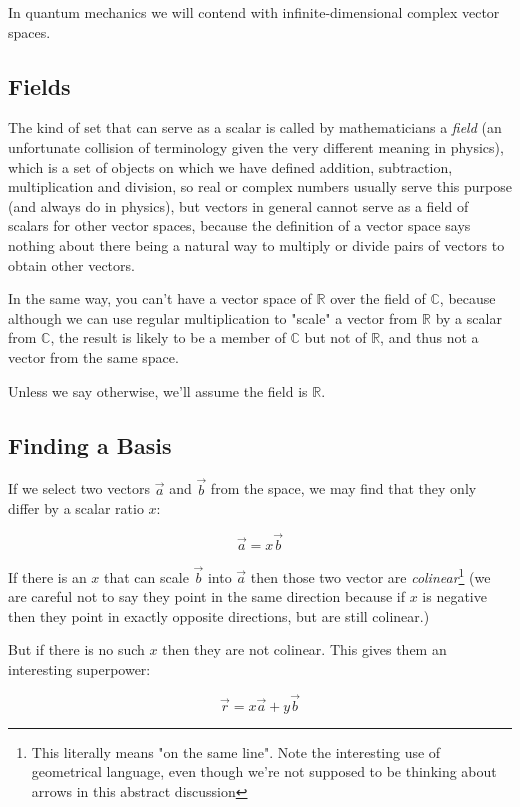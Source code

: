 In quantum mechanics we will contend with infinite-dimensional complex vector spaces.

\subsection{Fields}

The kind of set that can serve as a scalar is called by mathematicians a \textit{field} (an unfortunate collision of terminology given the very different meaning in physics), which is a set of objects on which we have defined addition, subtraction, multiplication and division, so real or complex numbers usually serve this purpose (and always do in physics), but vectors in general cannot serve as a field of scalars for other vector spaces, because the definition of a vector space says nothing about there being a natural way to multiply or divide pairs of vectors to obtain other vectors.

In the same way, you can't have a vector space of $\mathbb{R}$ over the field of $\mathbb{C}$, because although we can use regular multiplication to "scale" a vector from $\mathbb{R}$ by a scalar from $\mathbb{C}$, the result is likely to be a member of $\mathbb{C}$ but not of $\mathbb{R}$, and thus not a vector from the same space.

Unless we say otherwise, we'll assume the field is $\mathbb{R}$.

\subsection{Finding a Basis}

If we select two vectors $\vec{a}$ and $\vec{b}$ from the space, we may find that they only differ by a scalar ratio $x$:

$$
\vec{a} = x \vec{b}
$$

If there is an $x$ that can scale $\vec{b}$ into $\vec{a}$ then those two vector are \textit{colinear}\footnote{This literally means "on the same line". Note the interesting use of geometrical language, even though we're not supposed to be thinking about arrows in this abstract discussion} (we are careful not to say they point in the same direction because if $x$ is negative then they point in exactly opposite directions, but are still colinear.)

But if there is no such $x$ then they are not colinear. This gives them an interesting superpower:

$$
\vec{r} = x \vec{a} + y \vec{b}
$$

